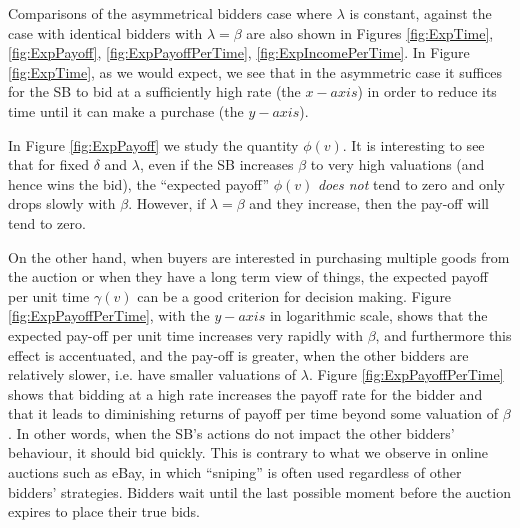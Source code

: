 \documentclass{article}
\begin{document}
Comparisons of the asymmetrical bidders case where $\lambda$ is
constant, against the case with identical bidders with
$\lambda=\beta$ are also shown in Figures \ref{fig:ExpTime},
\ref{fig:ExpPayoff}, \ref{fig:ExpPayoffPerTime},
\ref{fig:ExpIncomePerTime}. In Figure \ref{fig:ExpTime}, as we
would expect, we see that in the asymmetric case it suffices for
the SB to bid at a sufficiently high rate (the $x-axis$) in order
to reduce its time until it can make a purchase (the $y-axis$).

In Figure \ref{fig:ExpPayoff} we study the quantity $\phi(v)$. It
is interesting to see that for fixed $\delta$ and $\lambda$, even
if the SB increases $\beta$ to very high valuations (and hence
wins the bid), the ``expected payoff'' $\phi(v)$  {\em does not}
tend to zero and only drops slowly with $\beta$. However, if
$\lambda=\beta$ and they increase, then the pay-off will tend to
zero.

On the other hand, when buyers are interested in purchasing
multiple goods from the auction or when they have a long term view
of things, the expected payoff per unit time $\gamma(v)$ can be a
good criterion for decision making. Figure
\ref{fig:ExpPayoffPerTime}, with the $y-axis$ in logarithmic
scale, shows that the expected pay-off per unit time increases
very rapidly with $\beta$, and furthermore this effect is
accentuated, and the pay-off is greater, when the other bidders
are relatively slower, i.e. have smaller valuations of $\lambda$.
Figure \ref{fig:ExpPayoffPerTime} shows that bidding at a high
rate increases the payoff rate for the bidder and that it leads to
diminishing returns of payoff per time beyond some valuation of
$\beta$. In other words, when the SB's actions do not impact the
other bidders' behaviour, it should bid quickly. This is contrary
to what we observe in online auctions such as eBay, in which
``sniping'' is often used regardless of other bidders' strategies.
Bidders wait until the last possible moment before the auction
expires to place their true bids.
\end{document}
